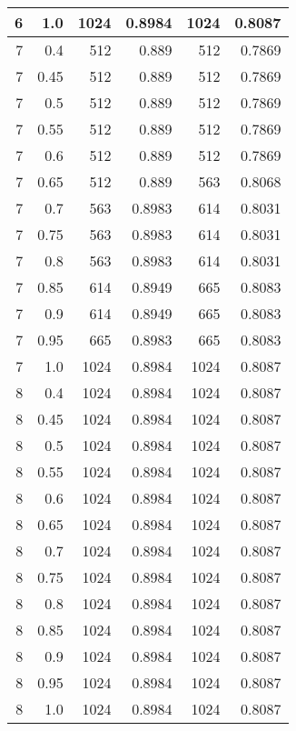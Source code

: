 \begin{center}
\begin{longtable}{|r|r|r|r|r|r|}
\hline
6 & 1.0 & 1024 & 0.8984 & 1024 & 0.8087 \\
\hline
7 & 0.4 & 512 & 0.889 & 512 & 0.7869 \\
\hline
7 & 0.45 & 512 & 0.889 & 512 & 0.7869 \\
\hline
7 & 0.5 & 512 & 0.889 & 512 & 0.7869 \\
\hline
7 & 0.55 & 512 & 0.889 & 512 & 0.7869 \\
\hline
7 & 0.6 & 512 & 0.889 & 512 & 0.7869 \\
\hline
7 & 0.65 & 512 & 0.889 & 563 & 0.8068 \\
\hline
7 & 0.7 & 563 & 0.8983 & 614 & 0.8031 \\
\hline
7 & 0.75 & 563 & 0.8983 & 614 & 0.8031 \\
\hline
7 & 0.8 & 563 & 0.8983 & 614 & 0.8031 \\
\hline
7 & 0.85 & 614 & 0.8949 & 665 & 0.8083 \\
\hline
7 & 0.9 & 614 & 0.8949 & 665 & 0.8083 \\
\hline
7 & 0.95 & 665 & 0.8983 & 665 & 0.8083 \\
\hline
7 & 1.0 & 1024 & 0.8984 & 1024 & 0.8087 \\
\hline
8 & 0.4 & 1024 & 0.8984 & 1024 & 0.8087 \\
\hline
8 & 0.45 & 1024 & 0.8984 & 1024 & 0.8087 \\
\hline
8 & 0.5 & 1024 & 0.8984 & 1024 & 0.8087 \\
\hline
8 & 0.55 & 1024 & 0.8984 & 1024 & 0.8087 \\
\hline
8 & 0.6 & 1024 & 0.8984 & 1024 & 0.8087 \\
\hline
8 & 0.65 & 1024 & 0.8984 & 1024 & 0.8087 \\
\hline
8 & 0.7 & 1024 & 0.8984 & 1024 & 0.8087 \\
\hline
8 & 0.75 & 1024 & 0.8984 & 1024 & 0.8087 \\
\hline
8 & 0.8 & 1024 & 0.8984 & 1024 & 0.8087 \\
\hline
8 & 0.85 & 1024 & 0.8984 & 1024 & 0.8087 \\
\hline
8 & 0.9 & 1024 & 0.8984 & 1024 & 0.8087 \\
\hline
8 & 0.95 & 1024 & 0.8984 & 1024 & 0.8087 \\
\hline
8 & 1.0 & 1024 & 0.8984 & 1024 & 0.8087 \\
\hline

\end{longtable}
\end{center}
